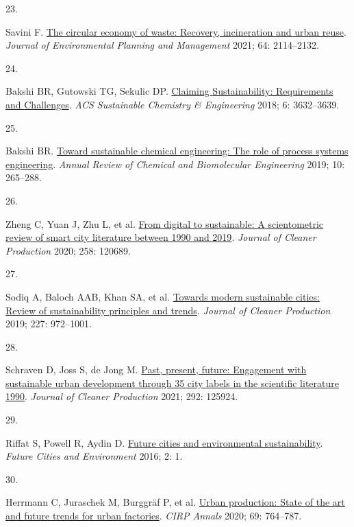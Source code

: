 \documentclass[
  11pt,
  a4paperpaper,
  onecolumn]{article}
\newlength{\cslhangindent}
\newlength{\csllabelwidth}
\newlength{\cslentryspacingunit} %
\newenvironment{CSLReferences}[2] %
 {%
  \setlength{\parindent}{0pt}
  \ifodd #1
  \let\oldpar\par
  \def\par{\hangindent=\cslhangindent\oldpar}
  \fi
  \setlength{\parskip}{#2\cslentryspacingunit}
 }%
 {}
\newcommand{\CSLLeftMargin}[1]{\parbox[t]{\csllabelwidth}{#1}}
\newcommand{\CSLRightInline}[1]{\parbox[t]{\linewidth - \csllabelwidth}{#1}\break}
\begin{document}
\begin{CSLReferences}{0}{0}
\leavevmode{}%
\CSLLeftMargin{23. }%
\CSLRightInline{Savini F.
\href{https://doi.org/10.1080/09640568.2020.1857226}{The circular
economy of waste: Recovery, incineration and urban reuse}. \emph{Journal
of Environmental Planning and Management} 2021; 64: 2114--2132.}

\leavevmode{}%
\CSLLeftMargin{24. }%
\CSLRightInline{Bakshi BR, Gutowski TG, Sekulic DP.
\href{https://doi.org/10.1021/acssuschemeng.7b03953}{Claiming
{Sustainability}: {Requirements} and {Challenges}}. \emph{ACS
Sustainable Chemistry \& Engineering} 2018; 6: 3632--3639.}

\leavevmode{}%
\CSLLeftMargin{25. }%
\CSLRightInline{Bakshi BR.
\href{https://doi.org/10.1146/annurev-chembioeng-060718-030332}{Toward
sustainable chemical engineering: {The} role of process systems
engineering}. \emph{Annual Review of Chemical and Biomolecular
Engineering} 2019; 10: 265--288.}

\leavevmode{}%
\CSLLeftMargin{26. }%
\CSLRightInline{Zheng C, Yuan J, Zhu L, et al.
\href{https://doi.org/10.1016/j.jclepro.2020.120689}{From digital to
sustainable: {A} scientometric review of smart city literature between
1990 and 2019}. \emph{Journal of Cleaner Production} 2020; 258: 120689.}

\leavevmode{}%
\CSLLeftMargin{27. }%
\CSLRightInline{Sodiq A, Baloch AAB, Khan SA, et al.
\href{https://doi.org/10.1016/j.jclepro.2019.04.106}{Towards modern
sustainable cities: {Review} of sustainability principles and trends}.
\emph{Journal of Cleaner Production} 2019; 227: 972--1001.}

\leavevmode{}%
\CSLLeftMargin{28. }%
\CSLRightInline{Schraven D, Joss S, de Jong M.
\href{https://doi.org/10.1016/j.jclepro.2021.125924}{Past, present,
future: {Engagement} with sustainable urban development through 35 city
labels in the scientific literature 1990\textendash 2019}. \emph{Journal
of Cleaner Production} 2021; 292: 125924.}

\leavevmode{}%
\CSLLeftMargin{29. }%
\CSLRightInline{Riffat S, Powell R, Aydin D.
\href{https://doi.org/10.1186/s40984-016-0014-2}{Future cities and
environmental sustainability}. \emph{Future Cities and Environment}
2016; 2: 1.}

\leavevmode{}%
\CSLLeftMargin{30. }%
\CSLRightInline{Herrmann C, Juraschek M, Burggräf P, et al.
\href{https://doi.org/10.1016/j.cirp.2020.05.003}{Urban production:
{State} of the art and future trends for urban factories}. \emph{CIRP
Annals} 2020; 69: 764--787.}


\end{CSLReferences}
\end{document}
